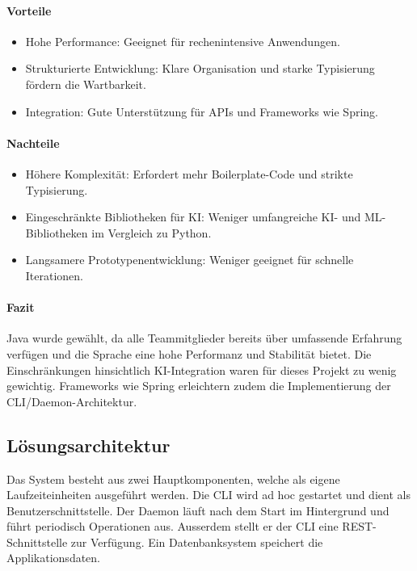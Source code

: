 \documentclass[a4paper,12pt]{report}
\begin{document}
    \paragraph{Vorteile}
    \begin{itemize}
        \item Hohe Performance: Geeignet für rechenintensive Anwendungen.
        \item Strukturierte Entwicklung: Klare Organisation und starke Typisierung fördern die Wartbarkeit.
        \item Integration: Gute Unterstützung für APIs und Frameworks wie Spring.
    \end{itemize}

    \paragraph{Nachteile}
    \begin{itemize}
        \item Höhere Komplexität: Erfordert mehr Boilerplate-Code und strikte Typisierung.
        \item Eingeschränkte Bibliotheken für KI: Weniger umfangreiche KI- und ML-Bibliotheken im Vergleich zu Python.
        \item Langsamere Prototypenentwicklung: Weniger geeignet für schnelle Iterationen.
    \end{itemize}

    \paragraph{Fazit}
    Java wurde gewählt, da alle Teammitglieder bereits über umfassende Erfahrung verfügen und die Sprache eine hohe Performanz und Stabilität bietet.
    Die Einschränkungen hinsichtlich KI-Integration waren für dieses Projekt zu wenig gewichtig.
    Frameworks wie Spring erleichtern zudem die Implementierung der CLI/Daemon-Architektur.
    \clearpage

    \subsection{Lösungsarchitektur}\label{subsec:loesungsarchitektur}

    Das System besteht aus zwei Hauptkomponenten, welche als eigene Laufzeiteinheiten ausgeführt werden.
    Die CLI wird ad hoc gestartet und dient als Benutzerschnittstelle.
    Der Daemon läuft nach dem Start im Hintergrund und führt periodisch Operationen aus.
    Ausserdem stellt er der
    CLI eine REST-Schnittstelle zur Verfügung.
    Ein Datenbanksystem speichert die Applikationsdaten.
\end{document}
